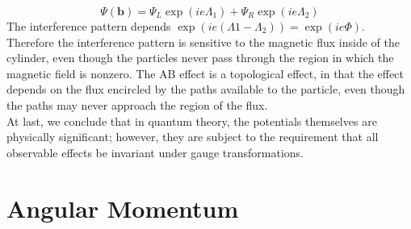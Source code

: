 \[\Psi(\bm{b}) = \Psi_L\exp(ie\Lambda_1) + \Psi_R\exp(ie\Lambda_2)\]
The interference pattern depends $\exp(ie(\Lambda1-\Lambda_2)) = \exp(ie\Phi)$. 
Therefore the interference pattern is sensitive to the magnetic flux inside of the cylinder, even though the particles never pass through the region in which the magnetic field is nonzero. 
The AB effect is a topological effect, in that the effect depends on the flux encircled by the paths available to the particle, even though the paths may never approach the region of the flux. \\
At last, we conclude that in quantum theory, the potentials themselves are physically significant; however, they are subject to the requirement that all observable effects be invariant under gauge transformations.

\chapter{Angular Momentum}
